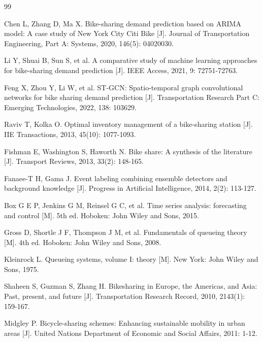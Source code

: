 \documentclass[12pt,a4paper]{article}
\begin{document}
\newpage

\begin{thebibliography}{99}

 Chen L, Zhang D, Ma X. Bike-sharing demand prediction based on ARIMA model: A case study of New York City Citi Bike [J]. Journal of Transportation Engineering, Part A: Systems, 2020, 146(5): 04020030.

 Li Y, Shuai B, Sun S, et al. A comparative study of machine learning approaches for bike-sharing demand prediction [J]. IEEE Access, 2021, 9: 72751-72763.

 Feng X, Zhou Y, Li W, et al. ST-GCN: Spatio-temporal graph convolutional networks for bike sharing demand prediction [J]. Transportation Research Part C: Emerging Technologies, 2022, 138: 103629.

 Raviv T, Kolka O. Optimal inventory management of a bike-sharing station [J]. IIE Transactions, 2013, 45(10): 1077-1093.

 Fishman E, Washington S, Haworth N. Bike share: A synthesis of the literature [J]. Transport Reviews, 2013, 33(2): 148-165.

 Fanaee-T H, Gama J. Event labeling combining ensemble detectors and background knowledge [J]. Progress in Artificial Intelligence, 2014, 2(2): 113-127.

 Box G E P, Jenkins G M, Reinsel G C, et al. Time series analysis: forecasting and control [M]. 5th ed. Hoboken: John Wiley and Sons, 2015.

 Gross D, Shortle J F, Thompson J M, et al. Fundamentals of queueing theory [M]. 4th ed. Hoboken: John Wiley and Sons, 2008.

 Kleinrock L. Queueing systems, volume I: theory [M]. New York: John Wiley and Sons, 1975.

 Shaheen S, Guzman S, Zhang H. Bikesharing in Europe, the Americas, and Asia: Past, present, and future [J]. Transportation Research Record, 2010, 2143(1): 159-167.

 Midgley P. Bicycle-sharing schemes: Enhancing sustainable mobility in urban areas [J]. United Nations Department of Economic and Social Affairs, 2011: 1-12.

\end{thebibliography}

\newpage
\end{document}

